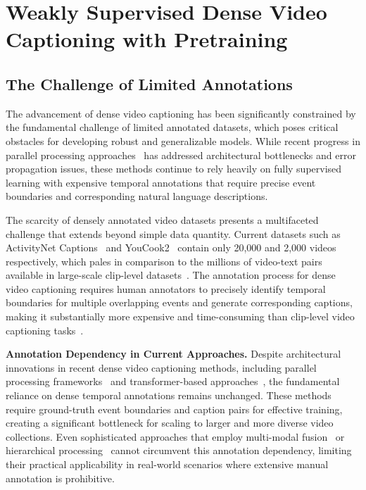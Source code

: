 
\chapter{Weakly Supervised Dense Video Captioning with Pretraining}
\label{chap:pws_dvc}

\section{The Challenge of Limited Annotations}

The advancement of dense video captioning has been significantly constrained by the fundamental challenge of limited annotated datasets, which poses critical obstacles for developing robust and generalizable models. While recent progress in parallel processing approaches~\cite{Wang2021-zi,Choi2022-cu} has addressed architectural bottlenecks and error propagation issues, these methods continue to rely heavily on fully supervised learning with expensive temporal annotations that require precise event boundaries and corresponding natural language descriptions.

The scarcity of densely annotated video datasets presents a multifaceted challenge that extends beyond simple data quantity. Current datasets such as ActivityNet Captions~\cite{Krishna2017-pw} and YouCook2~\cite{Zhou2018-eq} contain only 20,000 and 2,000 videos respectively, which pales in comparison to the millions of video-text pairs available in large-scale clip-level datasets~\cite{Miech2019-hk,Bain2021-si,Xu2016-ti}. The annotation process for dense video captioning requires human annotators to precisely identify temporal boundaries for multiple overlapping events and generate corresponding captions, making it substantially more expensive and time-consuming than clip-level video captioning tasks~\cite{Chen2011-ai,Wang2019-tk}.

\textbf{Annotation Dependency in Current Approaches.}
Despite architectural innovations in recent dense video captioning methods, including parallel processing frameworks~\cite{Wang2021-zi,Choi2022-cu} and transformer-based approaches~\cite{Zhou2018-zu,Lin2022-wi}, the fundamental reliance on dense temporal annotations remains unchanged. These methods require ground-truth event boundaries and caption pairs for effective training, creating a significant bottleneck for scaling to larger and more diverse video collections. Even sophisticated approaches that employ multi-modal fusion~\cite{Iashin2020-ln,Rahman2019-rp} or hierarchical processing~\cite{Deng2021-qd} cannot circumvent this annotation dependency, limiting their practical applicability in real-world scenarios where extensive manual annotation is prohibitive.

